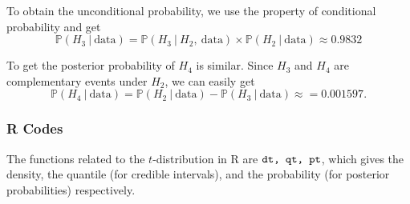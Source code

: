 \documentclass{article}
\begin{document}
To obtain the unconditional probability, we use the property of conditional probability and get
$$ \mathbb{P}(H_3~|~\text{data}) = \mathbb{P}(H_3~|~H_2,\ \text{data}) \times \mathbb{P}(H_2~|~\text{data}) \approx 0.9832 $$

To get the posterior probability of $H_4$ is similar. Since $H_3$ and $H_4$ are complementary events under $H_2$, we can easily get
$$ \mathbb{P}(H_4~|~\text{data}) = \mathbb{P}(H_2~|~\text{data}) - \mathbb{P}(H_3~|~\text{data}) \approx = 0.001597. $$

\subsubsection*{R Codes}

The functions related to the $t$-distribution in R are $\verb|dt, qt, pt|$, which gives the density, the quantile (for credible intervals), and the probability (for posterior probabilities) respectively.

 
\end{document}
